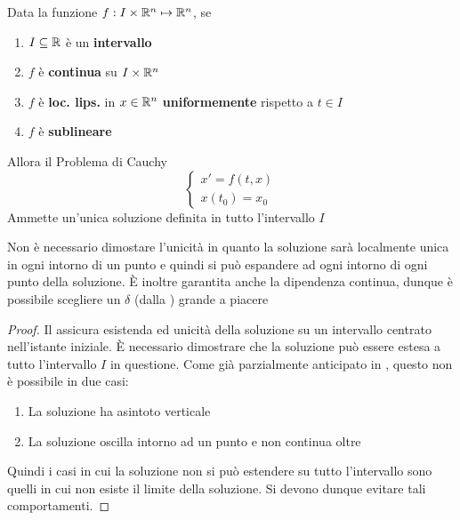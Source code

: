 \begin{theorem}
	\label{teo:cau_globale}
	Data la funzione $f: I \times \mathbb{R}^n \mapsto \mathbb{R}^n$, se
	\begin{enumerate}
		\item $I \subseteq \mathbb{R}$ è un \textbf{intervallo}
		\item $f$ è \textbf{continua} su $I\times \mathbb{R}^n$
		\item $f$ è \textbf{loc. lips.} in $x  \in \mathbb{R}^n$ \textbf{uniformemente} rispetto a $t \in I$
		\item $f$ è \textbf{sublineare}
	\end{enumerate}
	Allora il Problema di Cauchy
	\begin{equation}
		\label{eq:cau_glob_thesis_prob}
		\begin{cases}
			x' = f(t,x)\\
			x(t_0) = x_0
		\end{cases}
	\end{equation}
	Ammette un'unica soluzione definita in tutto l'intervallo $I$
	\begin{note}
		Non è necessario dimostare l'unicità in quanto la soluzione sarà localmente unica in ogni intorno di un punto e quindi si può espandere ad ogni intorno di ogni punto della soluzione.\newline
		È inoltre garantita anche la dipendenza continua, dunque è possibile scegliere un $\delta$ (dalla ) grande a piacere
	\end{note}
	\begin{proof}
		Il  assicura esistenda ed unicità della soluzione su un intervallo centrato nell'istante iniziale. È necessario dimostrare che la soluzione può essere estesa a tutto l'intervallo $I$ in questione. Come già parzialmente anticipato in , questo non è possibile in due casi:
		\begin{enumerate}
			\item La soluzione ha asintoto verticale
			\item La soluzione oscilla intorno ad un punto e non continua oltre
		\end{enumerate}
		Quindi i casi in cui la soluzione non si può estendere su tutto l'intervallo sono quelli in cui non esiste il limite della soluzione. Si devono dunque evitare tali comportamenti.


\end{proof}
\end{theorem}
